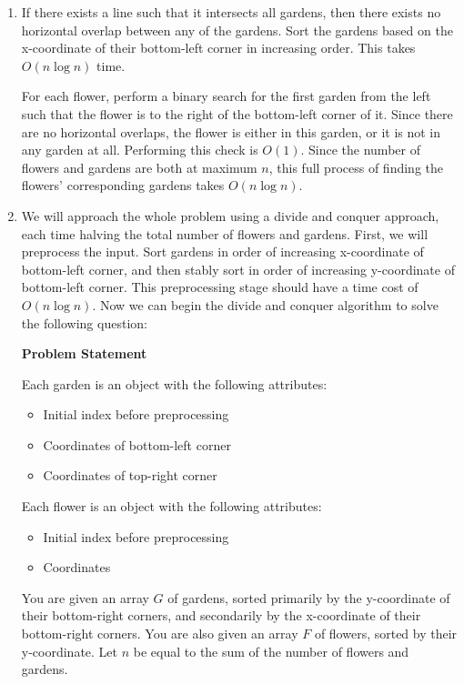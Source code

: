 \documentclass{article}
\begin{document}
\begin{solution}
\begin{enumerate}[label = (\alph*)]
    \item If there exists a line such that it intersects all gardens, then there exists no horizontal overlap between any of the gardens.
    Sort the gardens based on the x-coordinate of their bottom-left corner in increasing order. This takes $O(n\log n)$ time.
    
    For each flower, perform a binary search for the first garden from the left such that the flower is to the right of the bottom-left corner of it.
    Since there are no horizontal overlaps, the flower is either in this garden, or it is not in any garden at all. Performing this check is $O(1)$.
    Since the number of flowers and gardens are both at maximum $n$, this full process of finding the flowers' corresponding gardens takes $O(n\log n)$.

    \item We will approach the whole problem using a divide and conquer approach, each time halving the total number of flowers and gardens.
    First, we will preprocess the input. Sort gardens in order of increasing x-coordinate of bottom-left corner, and then stably sort in order of increasing y-coordinate of bottom-left corner. This preprocessing stage should have a time cost of $O(n\log n)$.
    Now we can begin the divide and conquer algorithm to solve the following question:

    \textbf{Problem Statement}

    Each garden is an object with the following attributes:
    \begin{itemize}
        \item Initial index before preprocessing
        \item Coordinates of bottom-left corner
        \item Coordinates of top-right corner
    \end{itemize}
    Each flower is an object with the following attributes:
    \begin{itemize}
        \item Initial index before preprocessing 
        \item Coordinates
    \end{itemize}

    You are given an array $G$ of gardens, sorted primarily by the y-coordinate of their bottom-right corners, 
    and secondarily by the x-coordinate of their bottom-right corners. 
    You are also given an array $F$ of flowers, sorted by their y-coordinate.
    Let $n$ be equal to the sum of the number of flowers and gardens.


\end{enumerate}
\end{solution}
\end{document}
